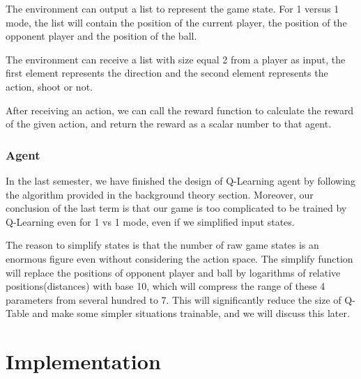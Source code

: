 \documentclass[12pt]{article}
\begin{document}
The environment can output a list to represent the game state. For 1 versus 1 mode, the list will contain the position of the current player, the position of the opponent player and the position of the ball.

The environment can receive a list with size equal 2 from a player as input, the first element represents the direction and the second element represents the action, shoot or not. 

After receiving an action, we can call the reward function to calculate the reward of the given action, and return the reward as a scalar number to that agent.

\subsubsection{Agent}

In the last semester, we have finished the design of Q-Learning agent by following the algorithm provided in the background theory section. Moreover, our conclusion of the last term is that our game is too complicated to be trained by Q-Learning even for 1 vs 1 mode, even if we simplified input states.

The reason to simplify states is that the number of raw game states is an enormous figure even without considering the action space. The simplify function will replace the positions of opponent player and ball by logarithms of relative positions(distances) with base 10, which will compress the range of these 4 parameters from several hundred to 7. This will significantly reduce the size of Q-Table and make some simpler situations trainable, and we will discuss this later.



\section{Implementation}
\end{document}
